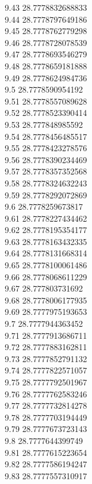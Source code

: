 {9.43	28.7778832688833\\
9.44	28.7778797649186\\
9.45	28.7778762779298\\
9.46	28.7778728078539\\
9.47	28.7778693546279\\
9.48	28.7778659181888\\
9.49	28.7778624984736\\
9.5	28.7778590954192\\
9.51	28.7778557089628\\
9.52	28.7778523390414\\
9.53	28.777848985592\\
9.54	28.7778456485517\\
9.55	28.7778423278576\\
9.56	28.7778390234469\\
9.57	28.7778357352568\\
9.58	28.7778324632243\\
9.59	28.7778292072869\\
9.6	28.7778259673817\\
9.61	28.7778227434462\\
9.62	28.7778195354177\\
9.63	28.7778163432335\\
9.64	28.7778131668314\\
9.65	28.7778100061486\\
9.66	28.7778068611229\\
9.67	28.777803731692\\
9.68	28.7778006177935\\
9.69	28.7777975193653\\
9.7	28.7777944363452\\
9.71	28.7777913686711\\
9.72	28.7777883162811\\
9.73	28.7777852791132\\
9.74	28.7777822571057\\
9.75	28.7777792501967\\
9.76	28.7777762583246\\
9.77	28.7777732814278\\
9.78	28.7777703194449\\
9.79	28.7777673723143\\
9.8	28.7777644399749\\
9.81	28.7777615223654\\
9.82	28.7777586194247\\
9.83	28.7777557310917\\
}
